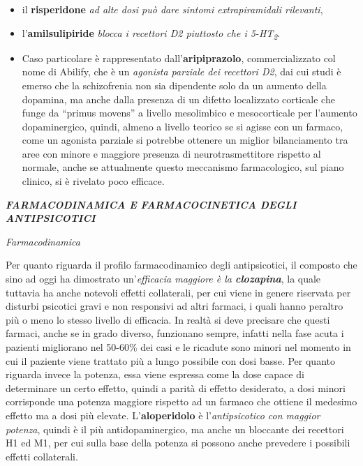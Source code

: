 \documentclass[]{article}
\begin{document}
\begin{itemize}
\item
  il \textbf{risperidone} \emph{ad alte dosi può dare sintomi
  extrapiramidali rilevanti},
\item
  l'\textbf{amilsulipiride} \emph{blocca i recettori D2 piuttosto che i
  5-HT\textsubscript{2}}.
\item
  Caso particolare è rappresentato dall'\textbf{aripiprazolo},
  commercializzato col nome di Abilify, che è un \emph{agonista parziale
  dei recettori D2}, dai cui studi è emerso che la schizofrenia non sia
  dipendente solo da un aumento della dopamina, ma anche dalla presenza
  di un difetto localizzato corticale che funge da ``primus movens'' a
  livello mesolimbico e mesocorticale per l'aumento dopaminergico,
  quindi, almeno a livello teorico se si agisse con un farmaco, come un
  agonista parziale si potrebbe ottenere un miglior bilanciamento tra
  aree con minore e maggiore presenza di neurotrasmettitore rispetto al
  normale, anche se attualmente questo meccanismo farmacologico, sul
  piano clinico, si è rivelato poco efficace.
\end{itemize}

\textbf{\emph{FARMACODINAMICA E FARMACOCINETICA DEGLI ANTIPSICOTICI}}

\emph{\emph{Farmacodinamica}}

Per quanto riguarda il profilo farmacodinamico degli antipsicotici, il
composto che sino ad oggi ha dimostrato un'\emph{efficacia maggiore è la
\textbf{clozapina}}, la quale tuttavia ha anche notevoli effetti
collaterali, per cui viene in genere riservata per disturbi psicotici
gravi e non responsivi ad altri farmaci, i quali hanno peraltro più o
meno lo stesso livello di efficacia. In realtà si deve precisare che
questi farmaci, anche se in grado diverso, funzionano sempre, infatti
nella fase acuta i pazienti migliorano nel 50-60\% dei casi e le
ricadute sono minori nel momento in cui il paziente viene trattato più a
lungo possibile con dosi basse. Per quanto riguarda invece la potenza,
essa viene espressa come la dose capace di determinare un certo effetto,
quindi a parità di effetto desiderato, a dosi minori corrisponde una
potenza maggiore rispetto ad un farmaco che ottiene il medesimo effetto
ma a dosi più elevate. L'\textbf{aloperidolo} è l'\emph{antipsicotico
con maggior potenza}, quindi è il più antidopaminergico, ma anche un
bloccante dei recettori H1 ed M1, per cui sulla base della potenza si
possono anche prevedere i possibili effetti collaterali.
\end{document}

